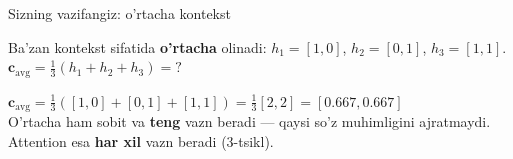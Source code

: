 \documentclass[aspectratio=169,11pt]{beamer}
\begin{document}
\begin{frame}{Sizning vazifangiz: o'rtacha kontekst}
  \begin{tcolorbox}[warnbox,title=Savol --- 60 soniya]
    \small
    Ba'zan kontekst sifatida \textbf{o'rtacha} olinadi: $h_1=[1,0]$, $h_2=[0,1]$,
    $h_3=[1,1]$.\\[4pt]
    \textbf{\large $\mathbf{c}_{\text{avg}} = \tfrac{1}{3}(h_1+h_2+h_3) = ?$}
  \end{tcolorbox}
  \pause
  \begin{tcolorbox}[okbox,title=Javob]
    \small
    $\mathbf{c}_{\text{avg}} = \tfrac{1}{3}([1,0]+[0,1]+[1,1]) = \tfrac{1}{3}[2,2]
       = [0.667, 0.667]$\\[3pt]
    \footnotesize O'rtacha ham sobit va \textbf{teng} vazn beradi --- qaysi so'z
    muhimligini ajratmaydi. Attention esa \textbf{har xil} vazn beradi (3-tsikl).
  \end{tcolorbox}
\end{frame}
\end{document}
